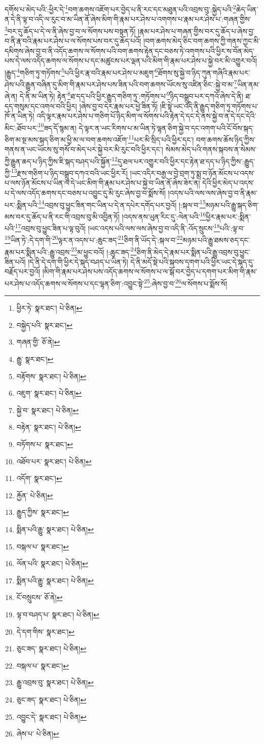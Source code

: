 དགོས་པ་མེད་པའི་:ཕྱིར་དེ་\footnote{ཕྱིར་ཏེ་  སྣར་ཐང་།  པེ་ཅིན། }བག་ཆགས་འཇོག་པར་བྱེད་པ་ནི་རང་དང་མཐུན་པའི་འབྲས་བུ་:སྐྱེད་པའི་\footnote{བསྐྱེད་པའི་  སྣར་ཐང་། }ཆེད་ཡིན་ན་དེ་ནི་ལྟ་བ་འདི་ལ་རུང་བ་མ་ཡིན་ནོ་ཞེས་མིག་གི་རྣམ་པར་ཤེས་པ་འགགས་པ་རྣམ་པར་ཤེས་པ་:གཞན་གྱིས་\footnote{གཞན་གྱི་  ཅོ་ནེ། }བར་དུ་ཆོད་པ་དེ་ལ་ནི་ཞེས་བྱ་བ་ལ་སོགས་པས་བསྟན་ཏོ། །རྣམ་པར་ཤེས་པ་གཞན་གྱིས་བར་དུ་ཆོད་པ་ཞེས་བྱ་བ་ནི་རྣ་བའི་རྣམ་པར་ཤེས་པ་ལ་སོགས་པས་བར་དུ་ཆོད་པའོ། །བག་ཆགས་མེད་ཅིང་བག་ཆགས་ཀྱི་གནས་ཀྱང་མི་དམིགས་ཞེས་བྱ་བ་ནི་འདོད་ཆགས་ལ་སོགས་པའི་བག་ཆགས་རྟེན་དང་བཅས་ཏེ་འགགས་པའི་ཕྱིར་ས་བོན་མེད་པས་དེ་ལས་འདོད་ཆགས་ལ་སོགས་པ་དང་མཚུངས་པར་ལྡན་པའི་མིག་གི་རྣམ་པར་ཤེས་པ་སྐྱེ་བར་མི་འགྱུར་བའོ། །རྒྱུད་\footnote{རྒྱུ་  སྣར་ཐང་། }གཅིག་ཏུ་གཏོགས་\footnote{བརྟོགས་  སྣར་ཐང་།  པེ་ཅིན། }པའི་ཕྱིར་རྣ་བའི་རྣམ་པར་ཤེས་པ་མཇུག་\footnote{འཇུག་  སྣར་ཐང་།  པེ་ཅིན། }ཐོགས་སུ་སྐྱེ་བ་ཉིད་ཀུན་གཞིའི་རྣམ་པར་ཤེས་པའི་རྒྱུན་བཞིན་དུ་མིག་གི་རྣམ་པར་ཤེས་པས་ཟིན་པའི་བག་ཆགས་ཡོངས་སུ་འཛིན་ཅིང་:སྐྱེ་བ་མ་\footnote{སྐྱེ་བ་  སྣར་ཐང་།  པེ་ཅིན། }ཡིན་ནམ་ཞེ་ན། དེ་ནི་མ་ཡིན་ཏེ། རྟེན་\footnote{བརྟེན་  སྣར་ཐང་།  པེ་ཅིན། }ཐ་དད་པའི་ཕྱིར་རྒྱུད་གཅིག་ཏུ་:གཏོགས་པ་\footnote{བཏོགས་པ་  སྣར་ཐང་། }ཉིད་བསྒྲུབ་པར་དཀའོ་ཞེས་དེ་ནི། ཐ་དད་གསུམ་དང་འགལ་བའི་ཕྱིར། །ཞེས་བྱ་བ་དེར་རྣམ་པར་ཕྱེ་ཟིན་ཏོ། །ཇི་སྟེ་ཡང་འདི་ནི་རྒྱུད་གཅིག་ཏུ་གཏོགས་པ་ཁོ་ན་ཡིན་ཏེ། འདི་ལྟར་རྣམ་པར་ཤེས་པ་གཅིག་པོ་ཉིད་མིག་ལ་སོགས་པའི་རྟེན་དེ་དང་དེ་ནས་སྐྱེ་བ་ན་དེ་དང་དེའི་མིང་:ཐོབ་པར་\footnote{འཐོབ་པར་  སྣར་ཐང་།  པེ་ཅིན། }ཟད་དོ་སྙམ་ན། དེ་ལྟར་ན་ཡང་རིགས་པ་མ་ཡིན་ཏེ་ལྷན་ཅིག་སྐྱེ་བ་དང་འགག་པའི་ངོ་བོས་སྐད་ཅིག་མ་སྔ་མས་སྐད་ཅིག་མ་ཕྱི་མ་ལ་བག་ཆགས་འཇོག་\footnote{འདོག་  སྣར་ཐང་། }པར་མི་སྲིད་པའི་ཕྱིར་དང་། བག་ཆགས་ཆོས་ཉིད་ཀྱིས་གནས་ན་ཡང་ཡོངས་སུ་གསོ་བ་མེད་པར་སྐྱེ་བར་མི་རུང་བའི་ཕྱིར་དང་། སེམས་མེད་པའི་གནས་སྐབས་ན་སེམས་ཀྱི་རྒྱུན་ཆད་པ་ཉིད་ཀྱིས་ཇི་སྐད་བཤད་པའི་སྐྱོན་\footnote{རྐྱོན་  པེ་ཅིན། }དུ་ཐལ་པར་འགྱུར་བའི་ཕྱིར་དང་རྟེན་ཐ་དད་པ་ཉིད་ཀྱིས་:རྒྱུད་ཀྱི་\footnote{རྒྱུད་ཀྱིས་  སྣར་ཐང་། }རྫས་གཅིག་པ་ཉིད་བསྒྲུབ་དཀའ་བའི་ཡང་ཕྱིར་རོ། །ཡང་འདིར་བརྒྱ་ལ་བྱེ་བྲག་ཏུ་སྨྲ་བ་ཉོན་མོངས་པ་འདས་པ་ལས་ཉོན་མོངས་པ་ཡིན་ལ་དེ་ཡང་མིག་གི་རྣམ་པར་ཤེས་པ་སྐྱེ་བ་ཡིན་ནོ་ཞེས་ཟེར་ན། དེའི་ཕྱིར་མེད་པ་འདས་པ་དེ་ལས་འདོད་ཆགས་དང་བཅས་པ་འབྱུང་དུ་མི་རུང་ཞེས་བྱ་བ་སྨོས་སོ། །འདས་པའི་ལས་ལས་ཞེས་བྱ་བ་ནི་རྣམ་པར་:སྨིན་པའི་\footnote{སྨིན་པའི་རྒྱུ་  སྣར་ཐང་།  པེ་ཅིན། }འབྲས་བུ་ཕྱུང་ཟིན་གང་ཡིན་པ་དེ་ན་དཔེར་དགོད་པར་བྱའོ། །:སྐལ་བ་\footnote{བསྐལ་པ་  སྣར་ཐང་། }མཉམ་པའི་རྒྱུ་སྐད་ཅིག་མས་བར་དུ་ཆོད་པ་ནི་རང་གི་འབྲས་བུ་མི་འབྱིན་ཏོ། །འདས་ནས་ཡུན་རིང་དུ་:ལེན་པའི་\footnote{ལོན་པའི་  སྣར་ཐང་།  པེ་ཅིན། }ཕྱིར་རྣམ་པར་:སྨིན་པའི་\footnote{སྨིན་པའི་རྒྱུ་  སྣར་ཐང་།  པེ་ཅིན། }འབྲས་བུ་ཕྱུང་ཟིན་པ་ལྟ་བུའོ། །ཡང་འདས་པའི་ལས་ལས་ཞེས་བྱ་བ་འདི་ནི་:འོད་སྲུངས་\footnote{ངོ་བསྲུངས་  ཅོ་ནེ། }པའི་:ལྟ་བ་\footnote{ལྟ་བ་བཤད་པ་  སྣར་ཐང་།  པེ་ཅིན། }ཡིན་ཏེ་:དེ་དག་གི་\footnote{དེ་དག་གིས་  སྣར་ཐང་། }ལྟར་ན་འདས་པ་:ཆུང་ཟད་\footnote{ཅུང་ཟད་  སྣར་ཐང་།  པེ་ཅིན། }ཅིག་ནི་ཡོད་དེ་:སྐལ་བ་\footnote{བསྐལ་པ་  སྣར་ཐང་། }མཉམ་པའི་རྒྱུ་ཐམས་ཅད་དང་རྣམ་པར་སྨིན་པའི་:རྒྱུ་འབྲས་\footnote{རྒྱུ་འབྲས་བུ་  སྣར་ཐང་།  པེ་ཅིན། }མ་ཕྱུང་བའོ། །:ཆུང་ཟད་\footnote{ཅུང་ཟད་  སྣར་ཐང་།  པེ་ཅིན། }ཅིག་ནི་མེད་དེ་རྣམ་པར་སྨིན་པའི་རྒྱུ་འབྲས་བུ་ཕྱུང་ཟིན་པའོ། །དེ་ནི་དེ་དག་གི་ཕྱིར་དེ་སྐད་བཤད་པ་ཡིན་ཏེ། དེ་ནི་མདོ་སྡེ་པའི་སྐབས་དགག་པའི་ཕྱིར་ཡང་དེ་སྐད་དུ་བརྗོད་པར་བྱའོ། །མིག་གི་རྣམ་པར་ཤེས་པས་འདོད་ཆགས་ལ་སོགས་པ་ལ་སྒོ་བར་བྱེད་པ་དགག་པར་མིག་གི་རྣམ་པར་ཤེས་པ་འདོད་ཆགས་ལ་སོགས་པ་དང་ལྷན་ཅིག་:འབྱུང་སྟེ་\footnote{འབྱུང་དེ་  སྣར་ཐང་།  པེ་ཅིན། }:ཞེས་བྱ་བ་\footnote{ཞེས་པ་  པེ་ཅིན། }ལ་སོགས་པ་སྨོས་སོ། 